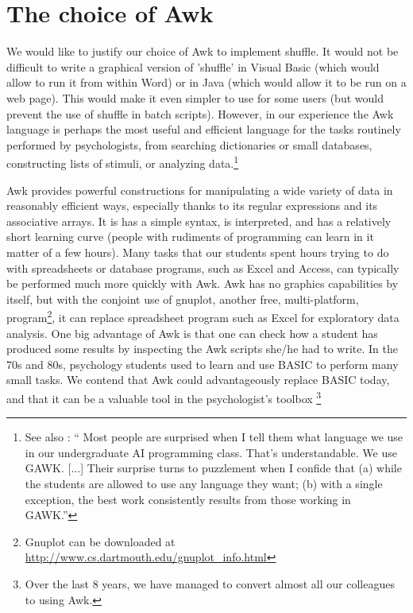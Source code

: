 \documentclass[doc]{apa}
\begin{document}
\section*{The choice of Awk}

We would like to justify our choice of Awk to implement shuffle. It
would not be difficult to write a graphical version of 'shuffle' in
Visual Basic (which would allow to run it from within Word) or in Java
(which would allow it to be run on a web page). This would make it
even simpler to use for some users (but would prevent the use of
shuffle in batch scripts).  However, in our experience the Awk
language is perhaps the most useful and efficient language for the
tasks routinely performed by psychologists, from searching
dictionaries or small databases, constructing lists of stimuli, or
analyzing data.\footnote{See also \cite{Loui96}: `` Most people are
  surprised when I tell them what language we use in our undergraduate
  AI programming class.  That's understandable.  We use GAWK.  [...]
  Their surprise turns to puzzlement when I confide that (a) while the
  students are allowed to use any language they want; (b) with a
  single exception, the best work consistently results from those
  working in GAWK.''}

Awk provides powerful constructions for manipulating a wide variety of
data in reasonably efficient ways, especially thanks to its regular
expressions and its associative arrays. It is has a simple syntax, is
interpreted, and has a relatively short learning curve (people with
rudiments of programming can learn in it matter of a few hours).  Many
tasks that our students spent hours trying to do with spreadsheets or
database programs, such as Excel and Access, can typically be
performed much more quickly with Awk. Awk has no graphics capabilities
by itself, but with the conjoint use of gnuplot, another free,
multi-platform, program\footnote{Gnuplot can be downloaded at
  \url{http://www.cs.dartmouth.edu/gnuplot_info.html}}, it can replace
spreadsheet program such as Excel for exploratory data analysis. One
big advantage of Awk is that one can check how a student has produced
some results by inspecting the Awk scripts she/he had to write. In the
70s and 80s, psychology students used to learn and use BASIC to
perform many small tasks. We contend that Awk could advantageously
replace BASIC today, and that it can be a valuable tool in the
psychologist's toolbox \footnote{Over the last 8 years, we have
  managed to convert almost all our colleagues to using Awk.}
\end{document}
